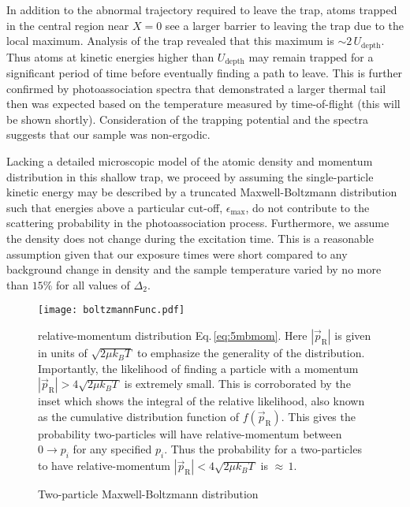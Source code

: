 In addition to the abnormal trajectory required to leave the trap, atoms trapped in the central region near $X=0$ see a larger barrier to leaving the trap due to the local maximum.
Analysis of the trap revealed that this maximum is $\sim 2 \, U_\text{depth}$.
Thus atoms at kinetic energies higher than $U_\text{depth}$ may remain trapped for a significant period of time before eventually finding a path to leave.
This is further confirmed by photoassociation spectra that demonstrated a larger thermal tail then was expected based on the temperature measured by time-of-flight (this will be shown shortly).
Consideration of the trapping potential and the spectra suggests that our sample was non-ergodic.

Lacking a detailed microscopic model of the atomic density and momentum distribution in this shallow trap, we proceed by assuming the single-particle kinetic energy may be described by a truncated Maxwell-Boltzmann distribution such that energies above a particular cut-off, $\epsilon_\text{max}$, do not contribute to the scattering probability in the photoassociation process.
Furthermore, we assume the density does not change during the excitation time.
This is a reasonable assumption given that our exposure times were short compared to any background change in density and the sample temperature varied by no more than $15$\% for all values of $\Delta_2$.
	\begin{figure} 
		\centerline{
		\texttt{[image: boltzmannFunc.pdf]}}
		\caption{Two-particle Maxwell-Boltzmann distribution}{relative-momentum distribution Eq.\,\ref{eq:5mbmom}. Here $|\vec{p}_\text{R}|$ is given in units of $\sqrt{2 \mu k_B T}$ to emphasize the generality of the distribution. Importantly, the likelihood of finding a particle with a momentum $|\vec{p}_\text{R}| > 4\sqrt{2 \mu k_B T}$ is extremely small. This is corroborated by the inset which shows the integral of the relative likelihood, also known as the cumulative distribution function of $f(\vec{p}_\text{R})$. This gives the probability two-particles will have relative-momentum between $0 \rightarrow p_i$ for any specified $p_i$. Thus the probability for a two-particles to have relative-momentum $|\vec{p}_\text{R}| < 4\sqrt{2 \mu k_B T}$ is $\approx\,1$.}
		\label{fig:singleBoltz}
	\end{figure}
	
